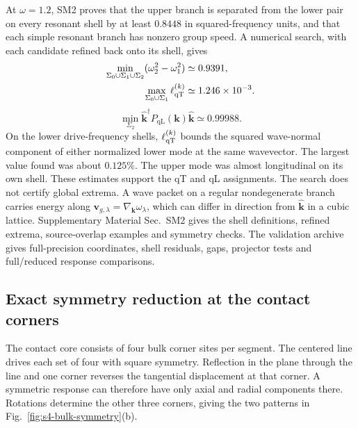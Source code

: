 \documentclass[10pt,aps,onecolumn,floatfix,notitlepage,nofootinbib,showkeys]{revtex4-2}
\newcommand{\vk}{\bm{k}}
\newcommand{\PqL}{P_{\mathrm{qL}}}
\begin{document}
At $\omega=1.2$, SM2 proves that the upper branch is separated from the lower pair on every resonant shell by at least $0.8448$ in squared-frequency units, and that each simple resonant branch has nonzero group speed. A numerical search, with each candidate refined back onto its shell, gives
\begin{align}
  \min_{\Sigma_0\cup\Sigma_1\cup\Sigma_2}
  (\omega_2^2-\omega_1^2)&\simeq0.9391,\\
  \max_{\Sigma_0\cup\Sigma_1}
  \ell_{\rm qT}^{(k)}&\simeq1.246\times10^{-3}.
  \label{eq:s4-gap-leakage-bounds}
\end{align}
\begin{equation}
  \min_{\Sigma_2}
  \hat{\vk}^{\dagger}\PqL(\vk)\hat{\vk}\simeq0.99988.
  \label{eq:s4-upper-purity}
\end{equation}
On the lower drive-frequency shells, $\ell_{\rm qT}^{(k)}$ bounds the squared wave-normal component of either normalized lower mode at the same wavevector. The largest value found was about $0.125\%$. The upper mode was almost longitudinal on its own shell. These estimates support the qT and qL assignments. The search does not certify global extrema. A wave packet on a regular nondegenerate branch carries energy along $\bm v_{g,\lambda}=\nabla_{\vk}\omega_\lambda$, which can differ in direction from $\hat{\vk}$ in a cubic lattice. Supplementary Material Sec.~SM2 gives the shell definitions, refined extrema, source-overlap examples and symmetry checks. The validation archive gives full-precision coordinates, shell residuals, gaps, projector tests and full/reduced response comparisons.

\subsection{Exact symmetry reduction at the contact corners}
\label{sec:s4-core-symmetry}

The contact core consists of four bulk corner sites per segment. The centered line drives each set of four with square symmetry. Reflection in the plane through the line and one corner reverses the tangential displacement at that corner. A symmetric response can therefore have only axial and radial components there. Rotations determine the other three corners, giving the two patterns in Fig.~\ref{fig:s4-bulk-symmetry}(b).
\end{document}
